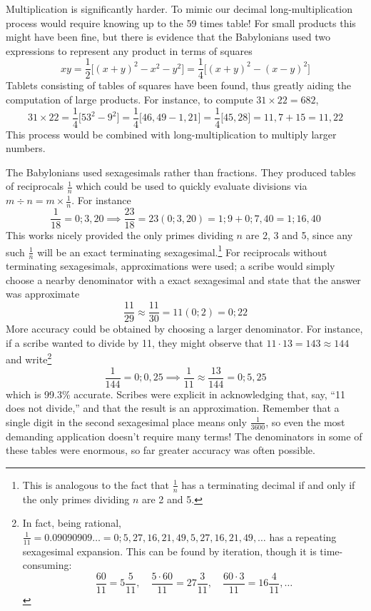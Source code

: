 Multiplication is significantly harder. To mimic our decimal long-multiplication process would require knowing up to the 59 times table! For small products this might have been fine, but there is evidence that the Babylonians used two expressions to represent any product in terms of squares
\[
	xy=\frac 12\bigl[(x+y)^2-x^2-y^2\bigr]=\frac 14\bigl[(x+y)^2-(x-y)^2\bigr]
\]
Tablets consisting of tables of squares have been found, thus greatly aiding the computation of large products. For instance, to compute $31\times 22=682$,
\[
	31\times 22=\frac 14\bigl[53^2-9^2\bigr] =\frac 14\bigl[46,49-1,21\bigr] =\frac 14\bigl[45,28\bigr] =11,7+15=11,22
\]
This process would be combined with long-multiplication to multiply larger numbers.


\label{babfraction}

The Babylonians used sexagesimals rather than fractions. They produced tables of reciprocals $\frac 1n$ which could be used to quickly evaluate divisions via $m\div n=m\times \frac 1n$. For instance
\[
	\frac 1{18}=0;3,20 \implies \frac{23}{18}=23(0;3,20) =1;9+0;7,40 =1;16,40
\]
This works nicely provided the only primes dividing $n$ are 2, 3 and 5, since any such $\frac 1n$ will be an exact terminating sexagesimal.\footnote{This is analogous to the fact that $\frac 1n$ has a terminating decimal if and only if the only primes dividing $n$ are 2 and 5.}
\smallbreak
For reciprocals without terminating sexagesimals, approximations were used; a scribe would simply choose a nearby denominator with a exact sexagesimal and state that the answer was approximate
\[
	\frac{11}{29}\approx\frac{11}{30}=11(0;2)=0;22
\]
More accuracy could be obtained by choosing a larger denominator. For instance, if a scribe wanted to divide by 11, they might observe that $11\cdot 13=143\approx 144$ and write\footnote{In fact, being rational, $\frac 1{11}=0.09090909\ldots=0;5,27,16,21,49,5,27,16,21,49,\ldots$ has a repeating sexagesimal expansion. This can be found by iteration, though it is time-consuming:
\[
	\frac{60}{11}=5\frac 5{11},\quad \frac{5\cdot 60}{11}=27\frac 3{11},\quad \frac{60\cdot 3}{11}=16\frac{4}{11},\ldots
\]
}
\[
	\frac 1{144}=0;0,25\implies \frac 1{11}\approx\frac{13}{144}=0;5,25
\]
which is 99.3\%{} accurate. Scribes were explicit in acknowledging that, say, ``11 does not divide,'' and that the result is an approximation. Remember that a single digit in the second sexagesimal place means only $\frac 1{3600}$, so even the most demanding application doesn't require many terms! The denominators in some of these tables were enormous, so far greater accuracy was often possible.
\medbreak


